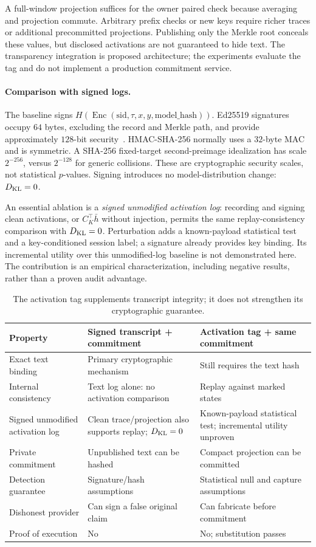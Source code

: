 \documentclass[11pt]{article}
\newcommand{\Enc}{\operatorname{Enc}}
\begin{document}
A full-window projection suffices for the owner paired check because averaging
and projection commute. Arbitrary prefix checks or new keys require richer traces
or additional precommitted projections. Publishing only the Merkle root conceals
these values, but disclosed activations are not guaranteed to hide text. The
transparency integration is proposed architecture; the experiments evaluate the
tag and do not implement a production commitment service.

\paragraph{Comparison with signed logs.}
The baseline signs $H(\Enc(\mathrm{sid},\tau,x,y,\mathrm{model\_hash}))$.
Ed25519 signatures occupy $64$ bytes, excluding the record and Merkle path, and
provide approximately $128$-bit security~\citep{rfc8032}. HMAC-SHA-256 normally
uses a $32$-byte MAC and is symmetric. A SHA-256 fixed-target second-preimage
idealization has scale $2^{-256}$, versus $2^{-128}$ for generic collisions.
These are cryptographic security scales, not statistical $p$-values. Signing
introduces no model-distribution change: $D_{\rm KL}=0$.

An essential ablation is a \emph{signed unmodified activation log}: recording and
signing clean activations, or $C_K^\top\bar h$ without injection, permits the same
replay-consistency comparison with $D_{\rm KL}=0$. Perturbation adds a known-payload
statistical test and a key-conditioned session label; a signature already provides
key binding. Its incremental utility over this unmodified-log baseline is not
demonstrated here. The contribution is an empirical characterization, including
negative results, rather than a proven audit advantage.
\begin{table}[htbp]\centering\small
\begin{tabular}{p{.25\linewidth}p{.32\linewidth}p{.32\linewidth}}
\toprule
Property & Signed transcript + commitment & Activation tag + same commitment\\
\midrule
Exact text binding & Primary cryptographic mechanism & Still requires the text hash\\
Internal consistency & Text log alone: no activation comparison & Replay against marked states\\
Signed unmodified activation log & Clean trace/projection also supports replay; $D_{\rm KL}=0$ & Known-payload statistical test; incremental utility unproven\\
Private commitment & Unpublished text can be hashed & Compact projection can be committed\\
Detection guarantee & Signature/hash assumptions & Statistical null and capture assumptions\\
Dishonest provider & Can sign a false original claim & Can fabricate before commitment\\
Proof of execution & No & No; substitution passes\\
\bottomrule
\end{tabular}
\caption{The activation tag supplements transcript integrity; it does not strengthen its cryptographic guarantee.}\label{tab:comparison}
\end{table}
\end{document}
